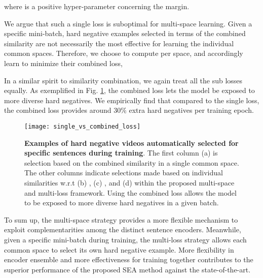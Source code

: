 where  is a positive hyper-parameter concerning the margin.




We argue that such a single loss is suboptimal for multi-space learning. Given a specific mini-batch, hard negative examples selected in terms of the combined similarity are not necessarily the most effective for learning the individual common spaces. Therefore, we choose to compute  per space, and accordingly learn to minimize their combined loss, \ie

In a similar spirit to similarity combination, we again treat all the sub losses equally. As exemplified in Fig. \ref{fig:hard-negative}, the combined loss lets the model be exposed to more diverse hard negatives. We empirically find that compared to the single loss, the combined loss provides around 30\% extra hard negatives per training epoch. 


\begin{figure}[tbh!]
\centering
\texttt{[image: single\_vs\_combined\_loss]}
\caption{\textbf{Examples of hard negative videos automatically selected for specific sentences during training}. The first column (a) is selection based on the combined similarity in a single common space. The other columns indicate selections made based on individual similarities w.r.t (b) , (c) , and (d)  within the proposed multi-space and multi-loss framework. Using the combined loss allows the model to be exposed to more diverse hard negatives in a given batch.}
\label{fig:hard-negative}
\end{figure}



To sum up, the multi-space strategy provides a more flexible mechanism to exploit complementarities among the distinct sentence encoders. Meanwhile, given a specific mini-batch during training, the multi-loss strategy allows each common space to select its own hard negative example. More flexibility in encoder ensemble and more effectiveness for training together contributes to the superior performance of the proposed SEA method against the state-of-the-art.



